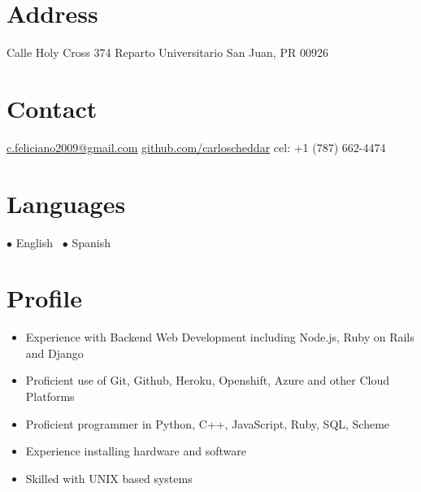 \documentclass[print]{friggeri-cv} %
\begin{document}


\begin{aside} %
\section{Address}\small
Calle Holy Cross 374
Reparto Universitario
San Juan, PR 00926
\section{Contact}
\href{mailto:c.feliciano2009@gmail.com}{\footnotesize c.feliciano2009@gmail.com}
\href{https://github.com/carloscheddar}{\footnotesize github.com/carloscheddar}
\footnotesize cel: +1 (787) 662-4474
\section{Languages}
$\bullet$ English \
$\bullet$ Spanish
\end{aside}


\section{Profile}

\begin{itemize}\small
\item Experience with Backend Web Development including Node.js, Ruby on Rails and Django
\item Proficient use of Git, Github, Heroku, Openshift, Azure and other Cloud
Platforms
\item Proficient programmer in Python, C++, JavaScript, Ruby, SQL, Scheme
\item Experience installing hardware and software
\item Skilled with UNIX based systems \\
\end{itemize}
\end{document}
